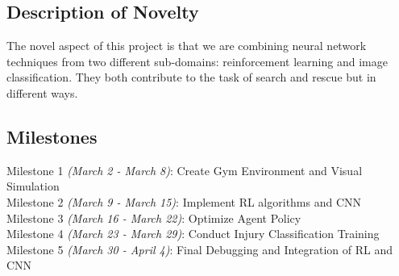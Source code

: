 \documentclass[12pt]{article}
\begin{document}
\subsection*{Description of Novelty}
The novel aspect of this project is that we are combining neural network techniques from two different sub-domains: reinforcement learning and image classification. They both contribute to the task of search and rescue but in different ways.

\subsection*{Milestones}
Milestone 1 {\small \it (March 2 - March 8)}: Create Gym Environment and Visual Simulation\\ 
Milestone 2 {\small \it (March 9 - March 15)}: Implement RL algorithms and CNN\\
Milestone 3 {\small \it (March 16 - March 22)}: Optimize Agent Policy\\
Milestone 4 {\small \it (March 23 - March 29)}: Conduct Injury Classification Training\\
Milestone 5 {\small \it (March 30 - April 4)}: Final Debugging and Integration of RL and CNN 
\end{document}

